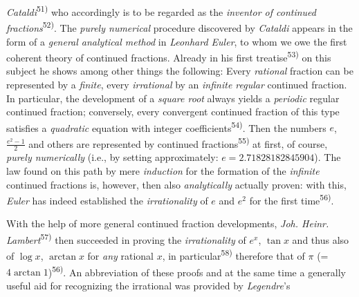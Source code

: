 \thispagestyle{fancy}

\vspace{0.5cm}

\textit{Cataldi}\textsuperscript{51)} who accordingly is to be regarded as the \textit{inventor of continued fractions}\textsuperscript{52)}. The \textit{purely numerical} procedure discovered by \textit{Cataldi} appears in the form of a \textit{general analytical method} in \textit{Leonhard Euler}, to whom we owe the first coherent theory of continued fractions. Already in his first treatise\textsuperscript{53)} on this subject he shows among other things the following: Every \textit{rational} fraction can be represented by a \textit{finite}, every \textit{irrational} by an \textit{infinite regular} continued fraction. In particular, the development of a \textit{square root} always yields a \textit{periodic} regular continued fraction; conversely, every convergent continued fraction of this type satisfies a \textit{quadratic} equation with integer coefficients\textsuperscript{54)}. Then the numbers $e$, $\frac{e^2 - 1}{2}$ and others are represented by continued fractions\textsuperscript{55)} at first, of course, \textit{purely numerically} (i.e., by setting approximately: $e = 2.71828182845904$). The law found on this path by mere \textit{induction} for the formation of the \textit{infinite} continued fractions is, however, then also \textit{analytically} actually proven: with this, \textit{Euler} has indeed established the \textit{irrationality} of $e$ and $e^2$ for the first time\textsuperscript{56)}.

With the help of more general continued fraction developments, \textit{Joh. Heinr. Lambert}\textsuperscript{57)} then succeeded in proving the \textit{irrationality} of $e^x$, $\tan x$ and thus also of $\log x$, $\arctan x$ for \textit{any} rational $x$, in particular\textsuperscript{58)} therefore that of $\pi$ (= $4 \arctan 1$)\textsuperscript{56)}. An abbreviation of these proofs and at the same time a generally useful aid for recognizing the irrational was provided by \textit{Legendre}'s


